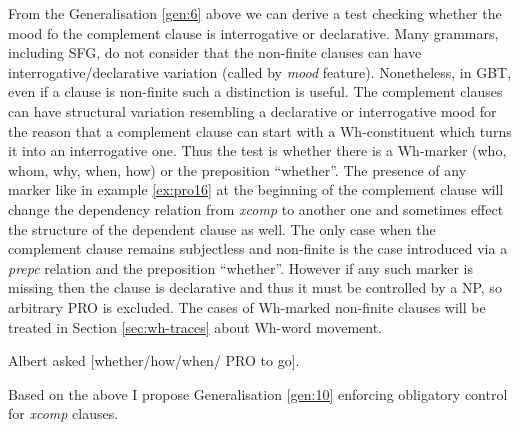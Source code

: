 
    From the Generalisation \ref{gen:6} above we can derive a test checking whether the mood fo the complement clause is interrogative or declarative. Many grammars, including SFG, do not consider that the non-finite clauses can have interrogative/declarative variation (called by \citet[107-167]{Halliday2004} \textit{mood} feature). Nonetheless, in GBT, even if a clause is non-finite such a distinction is useful. The complement clauses can have structural variation resembling a declarative or interrogative mood for the reason that a complement clause can start with a Wh-constituent which turns it into an interrogative one. Thus the test is whether there is a Wh-marker (who, whom, why, when, how) or the preposition ``whether''. The presence of any marker like in example \ref{ex:pro16} at the beginning of the complement clause will change the dependency relation from \textit{xcomp} to another one and sometimes effect the structure of the dependent clause as well. The only case when the complement clause remains subjectless and non-finite is the case introduced via a \textit{prepc} relation and the preposition ``whether''. However if any such marker is missing then the clause is declarative and thus it must be controlled by a NP, so arbitrary PRO is excluded. The cases of Wh-marked non-finite clauses will be treated in Section \ref{sec:wh-traces} about Wh-word movement.

    \begin{exe}
    	\ex \label{ex:pro16}Albert asked [whether/how/when/ PRO to go].
    \end{exe}
    
    Based on the above I propose Generalisation \ref{gen:10} enforcing obligatory control for \textit{xcomp} clauses.

    
